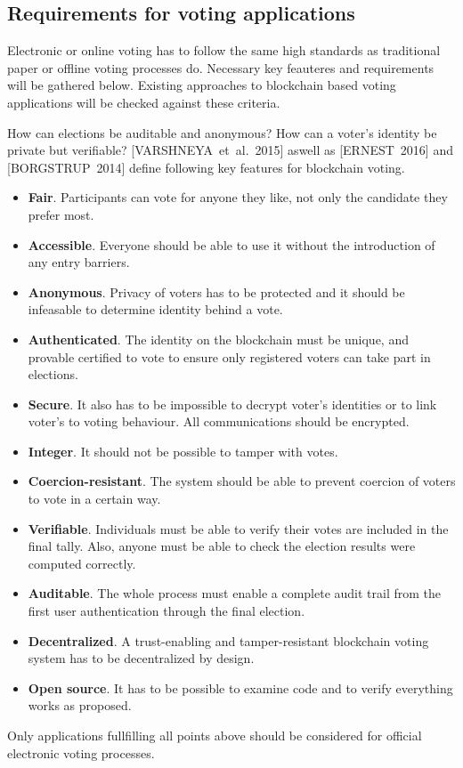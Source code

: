 \subsection{Requirements for voting applications}
\label{sec:req}
Electronic or online voting has to follow the same high standards as traditional paper or offline voting processes do. Necessary key feauteres and requirements will be gathered below. Existing approaches to blockchain based voting applications will be checked against these criteria.\par
How can elections be auditable and anonymous? How can a voter's identity be private but verifiable? [VARSHNEYA~et~al.~2015] aswell as [ERNEST~2016] and [BORGSTRUP~2014] define following key features for blockchain voting.
\begin{itemize}
\item \textbf{Fair}. Participants can vote for anyone they like, not only the candidate they prefer most.
\item \textbf{Accessible}. Everyone should be able to use it without the introduction of any entry barriers.
\item \textbf{Anonymous}. Privacy of voters has to be protected and it should be infeasable to determine identity behind a vote. %
\item \textbf{Authenticated}. The identity on the blockchain must be unique, and provable certified to vote to ensure only registered voters can take part in elections.
\item \textbf{Secure}. It also has to be impossible to decrypt voter's identities or to link voter's to voting behaviour. All communications should be encrypted.
\item \textbf{Integer}. It should not be possible to tamper with votes.
\item \textbf{Coercion-resistant}. The system should be able to prevent coercion of voters to vote in a certain way.
\item \textbf{Verifiable}. Individuals must be able to verify their votes are included in the final tally. Also, anyone must be able to check the election results were computed correctly.
\item \textbf{Auditable}. The whole process must enable a complete audit trail from the first user authentication through the final election.
\item \textbf{Decentralized}. A trust-enabling and tamper-resistant blockchain voting system has to be decentralized by design.
\item \textbf{Open source}. It has to be possible to examine code and to verify everything works as proposed.
\end{itemize}
Only applications fullfilling all points above should be considered for official electronic voting processes. %
